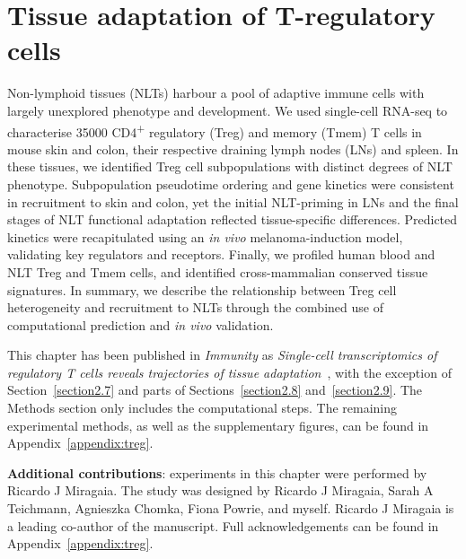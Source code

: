 
\chapter{Tissue adaptation of T-regulatory cells} \label{chap:Treg}

\ifpdf
    \graphicspath{{Chapter2/Figs/Raster/}{Chapter2/Figs/PDF/}{Chapter2/Figs/}}
\else
    \graphicspath{{Chapter2/Figs/Vector/}{Chapter2/Figs/}}
\fi

Non-lymphoid tissues (NLTs) harbour a pool of adaptive immune cells with largely unexplored phenotype and development. We used single-cell RNA-seq to characterise 35000 CD4\textsuperscript{+} regulatory (Treg) and memory (Tmem) T cells in mouse skin and colon, their respective draining lymph nodes (LNs) and spleen. In these tissues, we identified Treg cell subpopulations with distinct degrees of NLT phenotype. Subpopulation pseudotime ordering and gene kinetics were consistent in recruitment to skin and colon, yet the initial NLT-priming in LNs and the final stages of NLT functional adaptation reflected tissue-specific differences. Predicted kinetics were recapitulated using an \textit{in vivo} melanoma-induction model, validating key regulators and receptors. Finally, we profiled human blood and NLT Treg and Tmem cells, and identified cross-mammalian conserved tissue signatures. In summary, we describe the relationship between Treg cell heterogeneity and recruitment to NLTs through the combined use of computational prediction and \textit{in vivo} validation.

This chapter has been published in \textit{Immunity} as \textit{Single-cell transcriptomics of regulatory T cells reveals trajectories of tissue adaptation}~\citep{miragaia_single-cell_2019}, with the exception of Section~\ref{section2.7} and parts of Sections~\ref{section2.8} and~\ref{section2.9}. The Methods section only includes the computational steps. The remaining experimental methods, as well as the supplementary figures, can be found in Appendix~\ref{appendix:treg}.

\textbf{Additional contributions}: experiments in this chapter were performed by Ricardo J Miragaia. The study was designed by Ricardo J Miragaia, Sarah A Teichmann, Agnieszka Chomka, Fiona Powrie, and myself. Ricardo J Miragaia is a leading co-author of the manuscript. Full acknowledgements can be found in Appendix~\ref{appendix:treg}.


